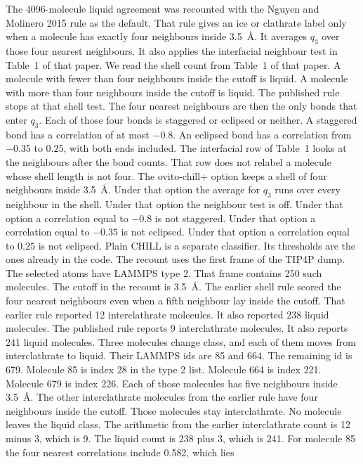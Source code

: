 The 4096-molecule liquid agreement was recounted with the Nguyen and
Molinero 2015 rule as the default.
That rule gives an ice or clathrate label only when a molecule has
exactly four neighbours inside 3.5~\AA.
It averages $q_3$ over those four nearest neighbours.
It also applies the interfacial neighbour test in Table~1 of that paper.
We read the shell count from Table~1 of that paper.
A molecule with fewer than four neighbours inside the cutoff is liquid.
A molecule with more than four neighbours inside the cutoff is liquid.
The published rule stops at that shell test.
The four nearest neighbours are then the only bonds that enter $q_3$.
Each of those four bonds is staggered or eclipsed or neither.
A staggered bond has a correlation of at most $-0.8$.
An eclipsed bond has a correlation from $-0.35$ to $0.25$, with both
ends included.
The interfacial row of Table~1 looks at the neighbours after the bond
counts.
That row does not relabel a molecule whose shell length is not four.
The ovito-chill+ option keeps a shell of four neighbours inside 3.5~\AA.
Under that option the average for $q_3$ runs over every neighbour in the
shell.
Under that option the neighbour test is off.
Under that option a correlation equal to $-0.8$ is not staggered.
Under that option a correlation equal to $-0.35$ is not eclipsed.
Under that option a correlation equal to $0.25$ is not eclipsed.
Plain CHILL is a separate classifier.
Its thresholds are the ones already in the code.
The recount uses the first frame of the TIP4P dump.
The selected atoms have LAMMPS type 2.
That frame contains 250 such molecules.
The cutoff in the recount is 3.5~\AA.
The earlier shell rule scored the four nearest neighbours even when a
fifth neighbour lay inside the cutoff.
That earlier rule reported 12 interclathrate molecules.
It also reported 238 liquid molecules.
The published rule reports 9 interclathrate molecules.
It also reports 241 liquid molecules.
Three molecules change class, and each of them moves from interclathrate
to liquid.
Their LAMMPS ids are 85 and 664.
The remaining id is 679.
Molecule 85 is index 28 in the type 2 list.
Molecule 664 is index 221.
Molecule 679 is index 226.
Each of those molecules has five neighbours inside 3.5~\AA.
The other interclathrate molecules from the earlier rule have four
neighbours inside the cutoff.
Those molecules stay interclathrate.
No molecule leaves the liquid class.
The arithmetic from the earlier interclathrate count is 12 minus 3,
which is 9.
The liquid count is 238 plus 3, which is 241.
For molecule 85 the four nearest correlations include 0.582, which lies
